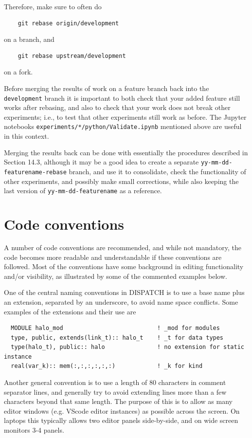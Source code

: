 \documentclass[paper=a4,fontsize=11pt]{scrartcl}
\numberwithin{equation}{section}		%
\numberwithin{figure}{section}			%
\numberwithin{table}{section}				%
\newcommand{\gitcolor}{\color{Brown}}
\newcommand{\codecolor}{\color{Blue}}
\newcommand{\filecolor}{\color{NavyBlue}}
\newcommand{\Git}[1]{\texttt{\gitcolor #1}}
\newcommand{\File}[1]{{\filecolor\texttt{#1}}}
\begin{document}
Therefore, make sure to often do
{\gitcolor\begin{verbatim}
    git rebase origin/development
\end{verbatim}}
on a branch, and
{\gitcolor\begin{verbatim}
    git rebase upstream/development
\end{verbatim}}
on a fork.

Before merging the results of work on a feature branch back into the \Git{development} branch it is important to both check that your added feature still works after rebasing, and also to check that your work does not break other experiments; i.e., to test that other experiments still work as before.  The Jupyter notebooks \File{experiments/*/python/Validate.ipynb} mentioned above are useful in this context.

Merging the results back can be done with essentially the procedures described in Section 14.3, although it may be a good idea to create a separate \Git{yy-mm-dd-featurename-rebase} branch, and use it to consolidate, check the functionality of other experiments, and possibly make small corrections, while also keeping the last version of \Git{yy-mm-dd-featurename} as a reference.

\section{Code conventions}
A number of code conventions are recommended, and while not mandatory, the code becomes more readable and understandable if these conventions are followed.  Most of the conventions have some background in editing functionality and/or visibility, as illustrated by some of the commented examples below.

One of the central naming conventions in DISPATCH is to use a base name plus an extension, separated by an underscore, to avoid name space conflicts. Some examples of the extensions and their use are
{\codecolor\begin{verbatim}
  MODULE halo_mod                           ! _mod for modules
  type, public, extends(link_t):: halo_t    ! _t for data types
  type(halo_t), public:: halo               ! no extension for static instance
  real(var_k):: mem(:,:,:,:,:,:)            ! _k for kind
\end{verbatim}}

Another general convention is to use a length of 80 characters in comment separator lines, and generally try to avoid extending lines more than a few characters beyond that same length.  The purpose of this is to allow as many editor windows (e.g. VScode editor instances) as possible across the screen.  On laptops this typically allows two editor panels side-by-side, and on wide screen monitors 3-4 panels.
\end{document}
